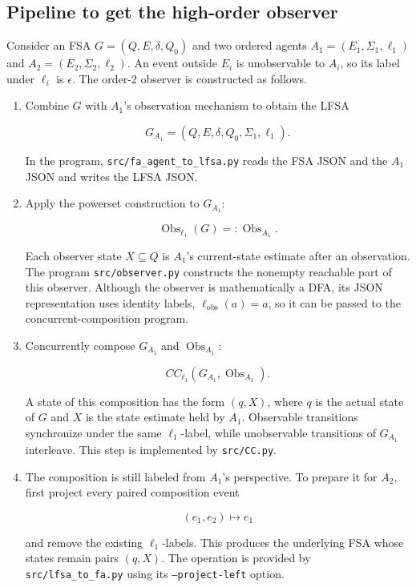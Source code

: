 \documentclass[11pt]{article}
\begin{document}
\subsection{Pipeline to get the high-order observer}


Consider an FSA $G=(Q,E,\delta,Q_0)$ and two ordered agents
$A_1=(E_1,\Sigma_1,\ell_1)$ and
$A_2=(E_2,\Sigma_2,\ell_2)$. An event outside $E_i$ is
unobservable to $A_i$, so its label under $\ell_i$ is
$\epsilon$. The order-2 observer is constructed as follows.

\begin{enumerate}
\item Combine $G$ with $A_1$'s observation mechanism to obtain the
LFSA

\[
   G_{A_1}=(Q,E,\delta,Q_0,\Sigma_1,\ell_1).
\]

In the program, \texttt{src/fa\_agent\_to\_lfsa.py} reads the FSA JSON and the
$A_1$ JSON and writes the LFSA JSON.

\item Apply the powerset construction to $G_{A_1}$:

\[
   \operatorname{Obs}_{\ell_1}(G)
   =:\operatorname{Obs}_{A_1}.
\]

Each observer state $X\subseteq Q$ is $A_1$'s current-state
estimate after an observation. The program \texttt{src/observer.py}
constructs the nonempty reachable part of this observer. Although
the observer is mathematically a DFA, its JSON representation uses
identity labels, $\ell_{\mathrm{obs}}(a)=a$, so it can be passed
to the concurrent-composition program.

\item Concurrently compose $G_{A_1}$ and
$\operatorname{Obs}_{A_1}$:

\[
   CC_{\ell_1}
   \left(G_{A_1},\operatorname{Obs}_{A_1}\right).
\]

A state of this composition has the form $(q,X)$, where $q$ is
the actual state of $G$ and $X$ is the state estimate held by
$A_1$. Observable transitions synchronize under the same
$\ell_1$-label, while unobservable transitions of $G_{A_1}$
interleave. This step is implemented by \texttt{src/CC.py}.

\item The composition is still labeled from $A_1$'s perspective. To
prepare it for $A_2$, first project every paired composition event

\[
   (e_1,e_2)\longmapsto e_1
\]

and remove the existing $\ell_1$-labels. This produces the
underlying FSA whose states remain pairs $(q,X)$. The operation is
provided by \texttt{src/lfsa\_to\_fa.py} using its \texttt{--project-left} option.


\end{enumerate}
\end{document}
